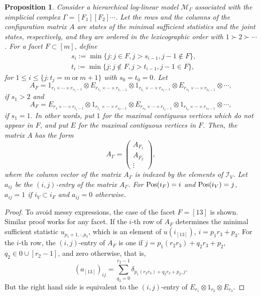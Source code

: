 \documentclass[a4paper,12pt]{article}
\theoremstyle{plain}
\newtheorem{proposition}[theorem]{Proposition}
\theoremstyle{remark}
\begin{document}
\begin{proposition}\label{prop:A}
  Consider a hierarchical log-linear model $\mathcal{M}_\Gamma$
  associated with the simplicial complex $\Gamma=[F_1][F_2]\cdots$.
  Let the rows and the columns of the configuration matrix $A$
  are states of the minimal sufficient statistics and
  the joint states, respectively, and they are ordered in
  the lexicographic order with $1\succ 2\succ\cdots$.
  For a facet $F\subset [m]$, define
  \begin{align*}
    &s_i:=\min\{j: j\in F, j>s_{i-1}, j-1\notin F\},\\
    &t_i:=\min\{j: j\notin F, j>t_{i-1}, j-1\in F\},
  \end{align*}
  for $1\le i\le \{j:t_j=m~\text{or}~m+1\}$ with $s_0=t_0=0$.
  Let
  \[
  A_F=1_{r_1\times \cdots \times r_{s_1-1}}\otimes
      E_{r_{s_1}\times \cdots \times r_{t_1-1}}\otimes
      1_{r_{t_1}\times \cdots \times r_{s_2-1}}\otimes
      E_{r_{s_2}\times \cdots \times r_{t_2-1}}\otimes\cdots,
  \]
  if $s_1>2$ and
  \[
  A_F=E_{r_{1}\times \cdots \times r_{t_1-1}}\otimes
      1_{r_{t_1}\times \cdots \times r_{s_2-1}}\otimes
      E_{r_{s_2}\times \cdots \times r_{t_2-1}}\otimes
      1_{r_{t_2}\times \cdots \times r_{s_3-1}}\otimes\cdots,
  \]
  if $s_1=1$. In other words, put $1$ for the maximal contiguous
  vertices which do not appear in $F$, and put $E$ for
  the maximal contiguous vertices in $F$. Then, the matrix $A$
  has the form
  \begin{equation}
  A_\Gamma=\left(
    \begin{array}{c}
    A_{F_1}\\
    A_{F_2}\\
    \vdots
    \end{array}  
    \right),
  \label{Ahie}
  \end{equation}
  where the column vector of the matrix $A_\Gamma$ is indexed
  by the elements of $\mathcal{I}_V$.
  Let $a_{ij}$ be the $(i,j)$-entry of the matrix $A_\Gamma$.
  For ${\rm Pos}(i_F)=i$ and ${\rm Pos}(i_V)=j$,
  $a_{ij} = 1$ if $i_V\subset i_F$ and $a_{ij}=0$ otherwise.
\end{proposition}

\begin{proof}
  To avoid messy expressions, the case of the facet $F=[13]$
  is shown. Similar proof works for any facet. If the $i$-th
  row of $A_F$ determines the minimal sufficient statistic
  $u_{p_1+1,\cdot,p_3}$, which is an element of $u(i_{[13]})$,
  $i=p_1 r_3+p_3$. For the $i$-th row, the $(i,j)$-entry of $A_F$
  is one if $j=p_1 (r_2r_3)+q_2 r_3+p_2$, $q_2\in 0\cup[r_2-1]$,
  and zero otherwise, that is,
  \[
    (a_{[13]})_{ij}
    =\sum_{q_2=0}^{r_2-1}\delta_{p_1 (r_2r_3)+q_2 r_3+p_2,j}.
  \]
  But the right hand side is equivalent to the $(i,j)$-entry
  of $E_{r_1}\otimes 1_{r_2} \otimes E_{r_3}$.
\end{proof}
\end{document}
